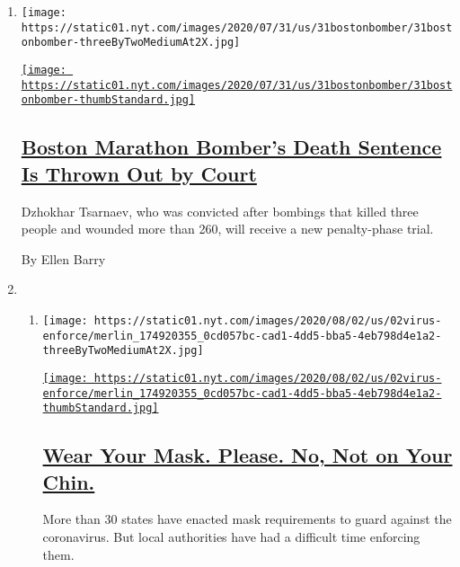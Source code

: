 \begin{enumerate}
\def\labelenumi{\arabic{enumi}.}
\item
  \texttt{[image: https://static01.nyt.com/images/2020/07/31/us/31bostonbomber/31bostonbomber-threeByTwoMediumAt2X.jpg]}

  \href{/2020/07/31/us/dzhokhar-tsarnaev-boston-marathon-bomber.html}{\texttt{[image: https://static01.nyt.com/images/2020/07/31/us/31bostonbomber/31bostonbomber-thumbStandard.jpg]}}

  \hypertarget{boston-marathon-bombers-death-sentence-is-thrown-out-by-court}{%
  \subsection{\texorpdfstring{\href{/2020/07/31/us/dzhokhar-tsarnaev-boston-marathon-bomber.html}{Boston
  Marathon Bomber's Death Sentence Is Thrown Out by
  Court}}{Boston Marathon Bomber's Death Sentence Is Thrown Out by Court}}\label{boston-marathon-bombers-death-sentence-is-thrown-out-by-court}}

  Dzhokhar Tsarnaev, who was convicted after bombings that killed three
  people and wounded more than 260, will receive a new penalty-phase
  trial.

  By Ellen Barry
\item
  \begin{enumerate}
  \def\labelenumii{\arabic{enumii}.}
  \item
    \texttt{[image: https://static01.nyt.com/images/2020/08/02/us/02virus-enforce/merlin\_174920355\_0cd057bc-cad1-4dd5-bba5-4eb798d4e1a2-threeByTwoMediumAt2X.jpg]}

    \href{/2020/07/31/us/coronavirus-masks-enforcement-key-west.html}{\texttt{[image: https://static01.nyt.com/images/2020/08/02/us/02virus-enforce/merlin\_174920355\_0cd057bc-cad1-4dd5-bba5-4eb798d4e1a2-thumbStandard.jpg]}}

    \hypertarget{wear-your-mask-please-no-not-on-your-chin}{%
    \subsection{\texorpdfstring{\href{/2020/07/31/us/coronavirus-masks-enforcement-key-west.html}{Wear
    Your Mask. Please. No, Not on Your
    Chin.}}{Wear Your Mask. Please. No, Not on Your Chin.}}\label{wear-your-mask-please-no-not-on-your-chin}}

    More than 30 states have enacted mask requirements to guard against
    the coronavirus. But local authorities have had a difficult time
    enforcing them.


\end{enumerate}
\end{enumerate}
